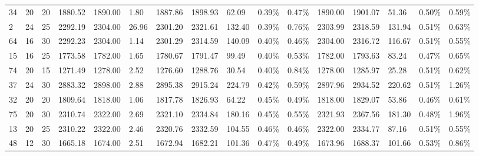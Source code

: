 \documentclass[../main]{subfiles}
\begin{document}
\begin{longtable}{l|ll|lll|lllll|lllll}
   34 & 20                         & 20                         & 1880.52                   & 1890.00     & 1.80                & 1887.86 & 1898.93 & 62.09  & 0.39\%  & 0.47\% & 1890.00 & 1901.07 & 51.36  & 0.50\%  & 0.59\% \\
   2  & 24                         & 25                         & 2292.19                   & 2304.00     & 26.96               & 2301.20 & 2321.61 & 132.40 & 0.39\%  & 0.76\% & 2303.99 & 2318.59 & 131.94 & 0.51\%  & 0.63\% \\
   64 & 16                         & 30                         & 2292.23                   & 2304.00     & 1.14                & 2301.29 & 2314.59 & 140.09 & 0.40\%  & 0.46\% & 2304.00 & 2316.72 & 116.67 & 0.51\%  & 0.55\% \\
   15 & 16                         & 25                         & 1773.58                   & 1782.00     & 1.65                & 1780.67 & 1791.47 & 99.49  & 0.40\%  & 0.53\% & 1782.00 & 1793.63 & 83.24  & 0.47\%  & 0.65\% \\
   74 & 20                         & 15                         & 1271.49                   & 1278.00     & 2.52                & 1276.60 & 1288.76 & 30.54  & 0.40\%  & 0.84\% & 1278.00 & 1285.97 & 25.28  & 0.51\%  & 0.62\% \\
   37 & 24                         & 30                         & 2883.32                   & 2898.00     & 2.88                & 2895.38 & 2915.24 & 224.79 & 0.42\%  & 0.59\% & 2897.96 & 2934.52 & 220.62 & 0.51\%  & 1.26\% \\
   32 & 20                         & 20                         & 1809.64                   & 1818.00     & 1.06                & 1817.78 & 1826.93 & 64.22  & 0.45\%  & 0.49\% & 1818.00 & 1829.07 & 53.86  & 0.46\%  & 0.61\% \\
   75 & 20                         & 30                         & 2310.74                   & 2322.00     & 2.69                & 2321.10 & 2334.84 & 180.16 & 0.45\%  & 0.55\% & 2321.93 & 2367.56 & 181.30 & 0.48\%  & 1.96\% \\
   13 & 20                         & 25                         & 2310.22                   & 2322.00     & 2.46                & 2320.76 & 2332.59 & 104.55 & 0.46\%  & 0.46\% & 2322.00 & 2334.77 & 87.16  & 0.51\%  & 0.55\% \\
   48 & 12                         & 30                         & 1665.18                   & 1674.00     & 2.51                & 1672.94 & 1682.21 & 101.36 & 0.47\%  & 0.49\% & 1673.96 & 1688.37 & 101.66 & 0.53\%  & 0.86\% \\

\end{longtable}
\end{document}
